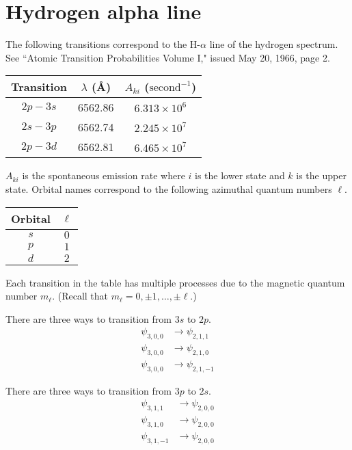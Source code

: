 \documentclass[12pt]{article}
\begin{document}
\section*{Hydrogen alpha line}

The following transitions correspond to the H-$\alpha$ line of the hydrogen spectrum.
See ``Atomic Transition Probabilities Volume I," issued May 20, 1966, page 2.

\begin{center}
\begin{tabular}{|c|c|c|}
\hline
Transition & $\lambda$ (\AA) & $A_{ki}$ ($\text{second}^{-1}$)
\\
\hline
$2p-3s$ & 6562.86 & $6.313\times10^6$
\\
$2s-3p$ & 6562.74 & $2.245\times10^7$
\\
$2p-3d$ & 6562.81 & $6.465\times10^7$
\\
\hline
\end{tabular}
\end{center}

$A_{ki}$ is the spontaneous emission rate where $i$ is the lower state and $k$ is the upper state.
Orbital names correspond to the following azimuthal quantum numbers $\ell$.
\begin{center}
\begin{tabular}{|c|c|}
\hline
Orbital & $\ell$
\\
\hline
$s$ & $0$
\\
$p$ & $1$
\\
$d$ & $2$
\\
\hline
\end{tabular}
\end{center}

Each transition in the table has multiple processes due to the magnetic quantum number $m_\ell$.
(Recall that $m_\ell=0,\pm1,\ldots,\pm\ell$.)

\bigskip
There are three ways to transition from $3s$ to $2p$.
\begin{align*}
\psi_{3,0,0}&\rightarrow\psi_{2,1,1}
\\
\psi_{3,0,0}&\rightarrow\psi_{2,1,0}
\\
\psi_{3,0,0}&\rightarrow\psi_{2,1,-1}
\end{align*}

There are three ways to transition from $3p$ to $2s$.
\begin{align*}
\psi_{3,1,1}&\rightarrow\psi_{2,0,0}
\\
\psi_{3,1,0}&\rightarrow\psi_{2,0,0}
\\
\psi_{3,1,-1}&\rightarrow\psi_{2,0,0}
\end{align*}
\end{document}
